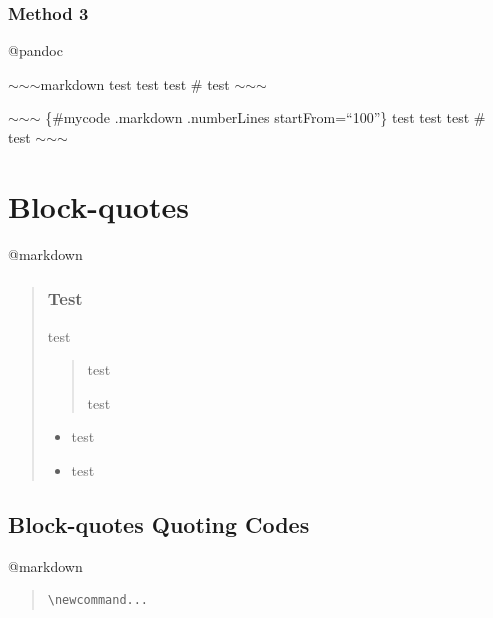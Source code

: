 \subsubsection{Method 3}
\label{method3}

@pandoc

\ensuremath{\sim}\ensuremath{\sim}\ensuremath{\sim}markdown
test
test
 test
 \# test
\ensuremath{\sim}\ensuremath{\sim}\ensuremath{\sim}

\ensuremath{\sim}\ensuremath{\sim}\ensuremath{\sim} \{\#mycode .markdown .numberLines startFrom=``100''\}
test
test
 test
 \# test
\ensuremath{\sim}\ensuremath{\sim}\ensuremath{\sim}

\section{Block-quotes}
\label{block-quotes}

@markdown

\begin{quote}

\subsubsection{Test}
\label{test}

test

\begin{quote}

test

test
\end{quote}

\begin{itemize}
\item test

\item test

\end{itemize}
\end{quote}

\subsection{Block-quotes Quoting Codes}
\label{block-quotesquotingcodes}

@markdown

\begin{quote}

\begin{verbatim}
\newcommand...
\end{verbatim}
\end{quote}

